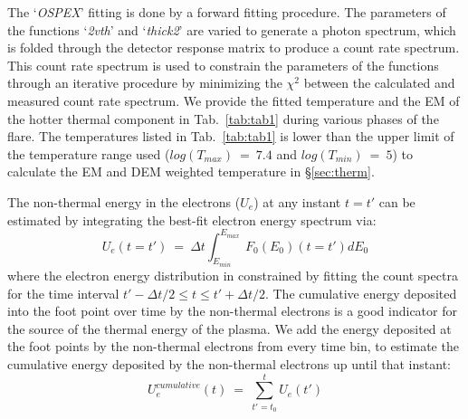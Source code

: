 The `\textit{OSPEX}' fitting is done by a forward fitting procedure. The parameters of the functions `\textit{2vth}' and `\textit{thick2}' are varied to generate a photon spectrum, which is folded through the detector response matrix to produce a count rate spectrum. This count rate spectrum is used to constrain the parameters of the functions through an iterative procedure by minimizing the $\chi^{2}$ between the calculated and measured count rate spectrum. We provide the fitted temperature and the EM of the hotter thermal component in Tab.~\ref{tab:tab1} during various phases of the flare. The temperatures listed in Tab.~\ref{tab:tab1} is lower than the upper limit of the temperature range used ($log(T_{max})~=~7.4$ and $log(T_{min})~=~5$) to calculate the EM and DEM weighted temperature in \S\ref{sec:therm}.

\begin{table}
    \centering
    \caption{Fitted temperature of the hotter component of the thermal plasma during various stages of the flare.}
    \label{tab:tab1}
\end{table}

The non-thermal energy in the electrons ($U_{e}$) at any instant $t=t'$ can be estimated by integrating the best-fit electron energy spectrum via: $$U_{e}(t=t')~=~\Delta t\int_{E_{min}}^{E_{max}}~F_{0}(E_{0})(t=t')dE_{0}$$ where the electron energy distribution in constrained by fitting the count spectra for the time interval $t'-\Delta t/2 \le t \le t'+\Delta t/2$. The cumulative energy deposited into the foot point over time by the non-thermal electrons is a good indicator for the source of the thermal energy of the plasma. We add the energy deposited at the foot points by the non-thermal electrons from every time bin, to estimate the cumulative energy deposited by the non-thermal electrons up until that instant: $$U^{cumulative}_{e}(t)~=~\sum_{t'=t_{0}}^{t}U_{e}(t')$$

